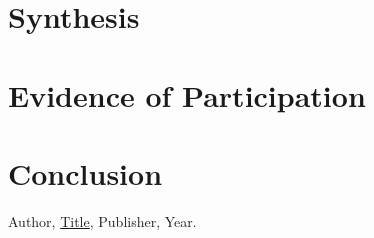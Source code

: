 \documentclass{article}
\theoremstyle{theorem}
\theoremstyle{definition}
\theoremstyle{remark}
\begin{document}
\section{Synthesis}

\section{Evidence of Participation}

\section{Conclusion}\label{conclusion}

\begin{thebibliography}{99}
 Author, \href{https://en.wikipedia.org/wiki/LaTeX}{Title}, Publisher, Year.
\end{thebibliography}
\end{document}
